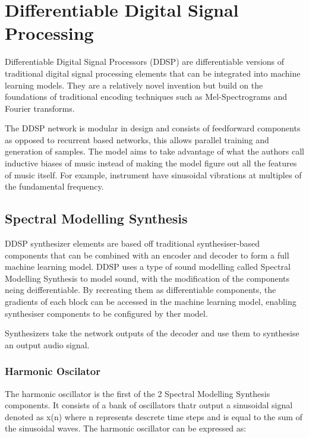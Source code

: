 \section{Differentiable Digital Signal Processing}
\label{section:DDSP}

Differentiable Digital Signal Processors (DDSP) are differentiable versions of traditional digital signal processing elements that can be integrated into machine learning models\cite{OriginalDDSP}. They are a relatively novel invention but build on the foundations of traditional encoding techniques such as Mel-Spectrograms and Fourier transforms.

The DDSP network is modular in design and consists of feedforward components as opposed to recurrent based networks, this allows parallel training and generation of samples. The model aims to take advantage of what the authors call inductive biases of music instead of making the model figure out all the features of music itself. For example, instrument have sinusoidal vibrations at multiples of the fundamental frequency.

\subsection{Spectral Modelling Synthesis}

DDSP synthesizer elements are based off traditional synthesiser-based components that can be combined with an encoder and decoder to form a full machine learning model. DDSP uses a type of sound modelling called Spectral Modelling Synthesis\cite{SpectralModellingSynthesis} to model sound, with the modification of the components neing deifferentiable. By recreating them as differentiable components, the gradients of each block can be accessed in the machine learning model, enabling synthesiser components to be configured by ther model.

Synthesizers take the network outputs of the decoder and use them to synthesise an output audio signal.

\subsubsection{Harmonic Oscilator}

The harmonic oscillator is the first of the 2 Spectral Modelling Synthesis components. It consists of a bank of oscillators thatr output a sinusoidal signal denoted as x(n) where n represents descrete time steps and is equal to the sum of the sinusoidal waves. The harmonic oscillator can be expressed as:

